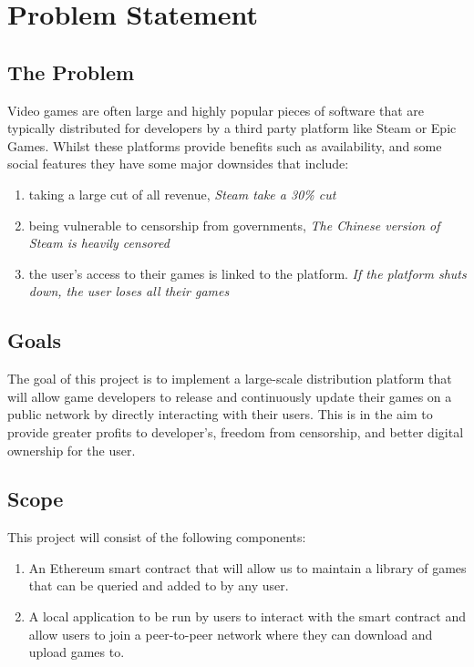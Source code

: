 
\chapter{Problem Statement}

\section{The Problem}
\label{sec:problem}

Video games are often large and highly popular pieces of software that are typically distributed for developers by a third party platform like Steam or Epic Games. Whilst these platforms provide benefits such as availability, and some social features they have some major downsides that include:
\vspace{1mm}
\begin{enumerate}[label=(\alph*)]
  \item taking a large cut of all revenue, \newline\textit{Steam take a 30\% cut~\cite{marks_report_2019,brown_valve_2021}}
  \item being vulnerable to censorship from governments, \newline\textit{The Chinese version of Steam is heavily censored~\cite{steamdb_steam_2021}}
  \item the user's access to their games is linked to the platform. \newline\textit{If the platform shuts down, the user loses all their games}
\end{enumerate}
\vspace{1mm}

\section{Goals}

The goal of this project is to implement a large-scale distribution platform that will allow game developers to release and continuously update their games on a public network by directly interacting with their users. This is in the aim to provide greater profits to developer's, freedom from censorship, and better digital ownership for the user.

\section{Scope}

This project will consist of the following components:

\begin{enumerate}
  \item An Ethereum smart contract that will allow us to maintain a library of games that can be queried and added to by any user.
  \item A local application to be run by users to interact with the smart contract and allow users to join a peer-to-peer network where they can download and upload games to.
\end{enumerate}